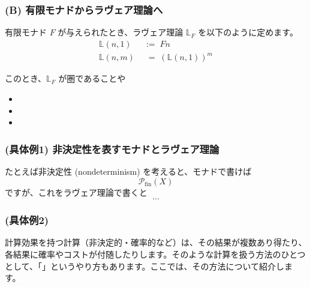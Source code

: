 \documentclass[
		head_space=20mm,
		foot_space=20mm,
		gutter=10mm,
		line_length=190mm
]{jlreq}
\begin{document}
\subsubsection*{(B) 有限モナドからラヴェア理論へ}

\noindent 有限モナド $F$ が与えられたとき、ラヴェア理論 $\mathbb L_F$ を以下のように定めます。
\begin{align*}
	\mathbb L(n,1) &\;:=\; Fn \\
	\mathbb L(n,m) &\;\;=\; \left(\mathbb L(n,1)\right)^m
\end{align*}

\noindent このとき、$\mathbb L_F$ が圏であることや
\begin{itemize}
	\item 
	\item 
	\item 
\end{itemize}

\clearpage

\subsubsection*{(具体例1) 非決定性を表すモナドとラヴェア理論}

\noindent たとえば非決定性 (nondeterminism) を考えると、モナドで書けば
\[\mathcal P_{\mathrm{fin}}(X)\]
ですが、これをラヴェア理論で書くと
\[...\]

\subsubsection*{(具体例2) }




\vspace{120pt}


\clearpage


\noindent\begin{large}\end{large}\vspace{5pt}

\noindent 計算効果を持つ計算（非決定的・確率的など）は、その結果が複数あり得たり、各結果に確率やコストが付随したりします。そのような計算を扱う方法のひとつとして、「」というやり方もあります。ここでは、その方法について紹介します。
\end{document}
